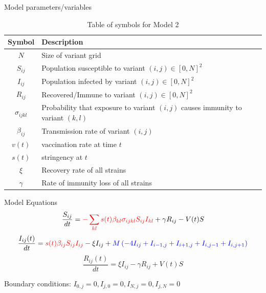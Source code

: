 \documentclass{beamer}
\begin{document}
    
\begin{frame}{Model parameters/variables}
    \begin{table}[h!]
        \begin{center}
        \begin{tabular}{c|p{8cm}}
                Symbol & Description\\
                \hline
                \hline
                $N$ & Size of variant grid \\
                $S_{ij}$ & Population susceptible to variant $(i,j) \in [0,N]^2$ \\
                $I_{ij}$ & Population infected by variant $(i,j) \in [0,N]^2$\\
                $R_{ij}$ & Recovered/Immune to variant $(i,j) \in [0,N]^2$\\
                $\sigma_{ijkl}$ & Probability that exposure to variant $(i,j)$ causes immunity \newline to variant $(k,l)$\\
                $\beta_{ij}$ & Transmission rate of variant $(i,j)$\\
                $v(t)$ & vaccination rate at time $t$\\
                $s(t)$ & stringency at $t$\\
                $\xi$ & Recovery rate of all strains \\
                $\gamma$ & Rate of immunity loss of all strains \\
        \end{tabular}
        \caption{Table of symbols for Model 2}
    
        \label{variables_2}
        \end{center}
    \end{table}
\end{frame}
\begin{frame}{Model Equations}
    \small
    \begin{equation}
        \frac{S_{ij}}{dt} = \textcolor{myred}{-\sum_{kl} s(t) \beta_{kl} \sigma_{ijkl} S_{ij} I_{kl}} + \gamma R_{ij} - V(t)S  \label{Seqn}
    \end{equation}
    \begin{equation}
        \frac{ I_{ij}(t)}{dt} = \textcolor{myred}{s(t) \beta_{ij} S_{ij} I_{ij}} - \xi I_{ij} + \textcolor{myblue}{M \left(- 4I_{ij} + I_{i-1,j}  + I_{i+1,j} + I_{i,j-1} + I_{i,j+1} \right)} \label{Ieqn}    
    \end{equation}
    \begin{equation}
        \frac{R_{ij}(t)}{dt} = \xi I_{ij} - \gamma R_{ij} + V(t)S \label{Reqn}
    \end{equation}

    Boundary conditions: $I_{0,j} = 0, I_{j,0} = 0,  I_{N,j} = 0, I_{j,N} = 0$
\end{frame}
\end{document}
